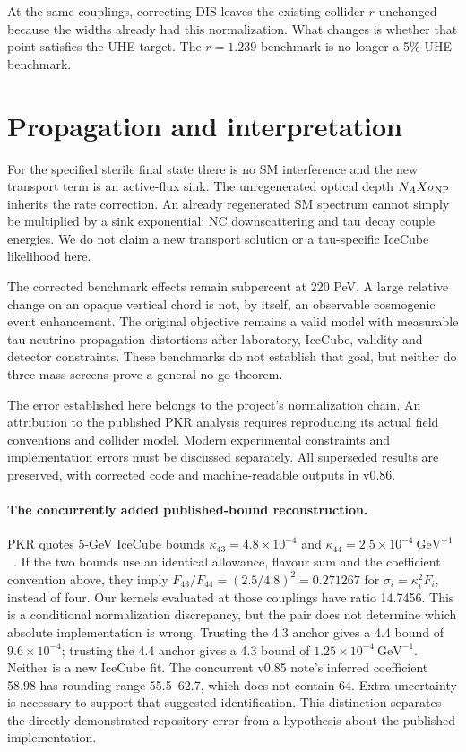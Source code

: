 \documentclass[11pt,a4paper]{article}
\begin{document}
At the same couplings, correcting DIS leaves the existing collider $r$
unchanged because the widths already had this normalization. What changes is
whether that point satisfies the UHE target. The $r=1.239$ benchmark is no
longer a 5\% UHE benchmark.

\section{Propagation and interpretation}
For the specified sterile final state there is no SM interference and the
new transport term is an active-flux sink. The unregenerated optical depth
$N_AX\sigma_{\rm NP}$ inherits the rate correction. An already regenerated
SM spectrum cannot simply be multiplied by a sink exponential: NC downscattering
and tau decay couple energies. We do not claim a new transport solution or a
tau-specific IceCube likelihood here.

The corrected benchmark effects remain subpercent at 220 PeV. A large
relative change on an opaque vertical chord is not, by itself, an observable
cosmogenic event enhancement. The original objective remains a valid model
with measurable tau-neutrino propagation distortions after laboratory,
IceCube, validity and detector constraints. These benchmarks do not establish
that goal, but neither do three mass screens prove a general no-go theorem.

The error established here belongs to the project's normalization chain.
An attribution to the published PKR analysis requires reproducing its actual
field conventions and collider model. Modern experimental constraints and
implementation errors must be discussed separately. All superseded results
are preserved, with corrected code and machine-readable outputs in v0.86.

\paragraph{The concurrently added published-bound reconstruction.}
PKR quotes 5-GeV IceCube bounds $\kappa_{43}=4.8\times10^{-4}$ and
$\kappa_{44}=2.5\times10^{-4}\ \mathrm{GeV}^{-1}$~\cite{PKR}. If the two
bounds use an identical allowance, flavour sum and the coefficient convention
above, they imply $F_{43}/F_{44}=(2.5/4.8)^2=0.271267$ for
$\sigma_i=\kappa_i^2F_i$, instead of four. Our kernels evaluated at those
couplings have ratio 14.7456. This is a conditional normalization discrepancy,
but the pair does not determine which absolute implementation is wrong.
Trusting the 4.3 anchor gives a 4.4 bound of $9.6\times10^{-4}$; trusting the 4.4
anchor gives a 4.3 bound of $1.25\times10^{-4}\ \mathrm{GeV}^{-1}$.
Neither is a new IceCube fit. The concurrent v0.85 note's inferred coefficient
58.98 has rounding range 55.5--62.7, which does not contain 64. Extra uncertainty
is necessary to support that suggested identification. This distinction
separates the directly demonstrated repository error from a hypothesis about
the published implementation.
\end{document}
